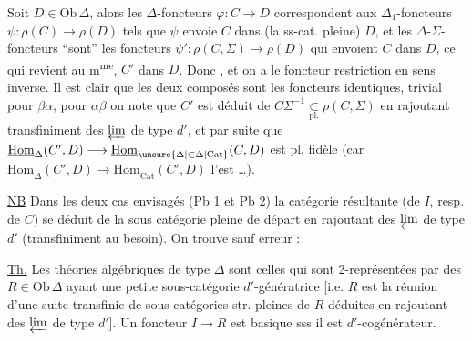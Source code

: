 Soit $D\in\mathrm{Ob}\,\Delta$, alors les $\Delta$-foncteurs $\varphi:C\longrightarrow D$ correspondent aux $\Delta_1$-foncteurs $\psi:\rho(C)\longrightarrow\rho(D)$ tels que $\psi$ envoie $C$ dans (la ss-cat. pleine) $D$, et les $\Delta$-$\Sigma$-foncteurs ``sont''  les foncteurs $\psi':\rho(C,\Sigma)\longrightarrow\rho(D)$  qui envoient $C$ dans $D$,  ce qui revient au m\textsuperscript{me}, $C'$ dans $D$. Donc
, et on a le foncteur restriction en sens inverse. Il est clair que les deux composés sont \inserted{$\simeq$} les foncteurs identiques, trivial pour $\beta\alpha$, pour $\alpha\beta$ on note que  $C'$ est déduit de $C\Sigma^{-1}\underset{\mathrm{pl.}}{\subset}\rho(C,\Sigma)$ en rajoutant transfiniment des $\varprojlim$ de type $d'$, et par suite que $\underline{\mathrm{Hom}}_\Delta(C',D)\longrightarrow\underline{\mathrm{Hom}}_{\unsure{\Delta|\subset\Delta|\mathrm{Cat}}}(C,D)$ est pl. fidèle (car $\underline{\mathrm{Hom}}_\Delta(C',D)\longrightarrow\underline{\mathrm{Hom}}_{\mathrm{Cat}}(C',D)$ l'est \ldots).

\uline{NB} Dans les deux cas envisagés (Pb 1 et Pb 2) la catégorie résultante (de $I$, resp. de $C$) se déduit de la sous catégorie pleine de départ en rajoutant des $\varprojlim$ de type $d'$ (transfiniment au besoin). On trouve sauf erreur :


\uline{Th.} Les théories algébriques de type $\Delta$ sont celles qui sont 2-représentées par des $R\in\mathrm{Ob}\,\Delta$ ayant une petite sous-catégorie   $d'$-génératrice [i.e.  $R$ est la réunion d'une suite transfinie de sous-catégories str. pleines de $R$ déduites en rajoutant des $\varprojlim$ de type $d'$]. Un foncteur $I\longrightarrow R$  est basique sss il est $d'$-cogénérateur.
